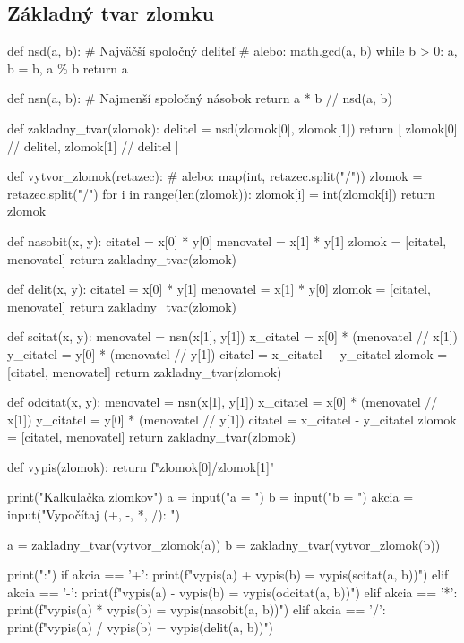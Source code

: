 \subsection{Základný tvar zlomku}
\begin{solution}
def nsd(a, b):
    # Najväčší spoločný deliteľ
    # alebo: math.gcd(a, b)
    while b > 0:
        a, b = b, a \% b
    return a

def nsn(a, b):
    # Najmenší spoločný násobok
    return a * b // nsd(a, b)

def zakladny_tvar(zlomok):
    delitel = nsd(zlomok[0], zlomok[1])
    return [
        zlomok[0] // delitel,
        zlomok[1] // delitel
    ]

def vytvor_zlomok(retazec):
    # alebo: map(int, retazec.split("/"))
    zlomok = retazec.split("/")
    for i in range(len(zlomok)):
        zlomok[i] = int(zlomok[i])
    return zlomok

def nasobit(x, y):
    citatel = x[0] * y[0]
    menovatel = x[1] * y[1]
    zlomok = [citatel, menovatel]
    return zakladny_tvar(zlomok)

def delit(x, y):
    citatel = x[0] * y[1]
    menovatel = x[1] * y[0]
    zlomok = [citatel, menovatel]
    return zakladny_tvar(zlomok)

def scitat(x, y):
    menovatel = nsn(x[1], y[1])
    x_citatel = x[0] * (menovatel // x[1])
    y_citatel = y[0] * (menovatel // y[1])
    citatel = x_citatel + y_citatel
    zlomok = [citatel, menovatel]
    return zakladny_tvar(zlomok)

def odcitat(x, y):
    menovatel = nsn(x[1], y[1])
    x_citatel = x[0] * (menovatel // x[1])
    y_citatel = y[0] * (menovatel // y[1])
    citatel = x_citatel - y_citatel
    zlomok = [citatel, menovatel]
    return zakladny_tvar(zlomok)

def vypis(zlomok):
    return f"{zlomok[0]}/{zlomok[1]}"

print("Kalkulačka zlomkov")
a = input("a = ")
b = input("b = ")
akcia = input("Vypočítaj (+, -, *, /): ")

a = zakladny_tvar(vytvor_zlomok(a))
b = zakladny_tvar(vytvor_zlomok(b))

print(":")
if akcia == '+':
    print(f"{vypis(a)} + {vypis(b)} = {vypis(scitat(a, b))}")
elif akcia == '-':
    print(f"{vypis(a)} - {vypis(b)} = {vypis(odcitat(a, b))}")
elif akcia == '*':
    print(f"{vypis(a)} * {vypis(b)} = {vypis(nasobit(a, b))}")
elif akcia == '/':
    print(f"{vypis(a)} / {vypis(b)} = {vypis(delit(a, b))}")
\end{solution}
